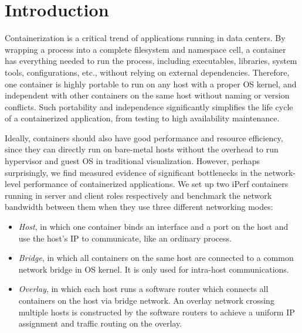 \section{Introduction} \label{sec:introduction}


Containerization is a critical trend of applications running in data centers.
By wrapping a process into a complete filesystem and namespace cell, a container
has everything needed to run the process, including executables, libraries, system
tools, configurations, etc., without relying on external dependencies. 
Therefore, one container
is highly portable to run on any host with a proper OS kernel, and independent
with other containers on the same host without naming or version conflicts.
Such portability and independence significantly simplifies the life cycle of
a containerized application, from testing to high availability maintenance.

Ideally, containers should also have good performance and resource efficiency,
since they can directly run on bare-metal hosts without the overhead to run
hypervisor and guest OS in traditional visualization. However, perhaps 
surprisingly, we find measured evidence of significant bottlenecks in the 
network-level performance of containerized applications. We set up two iPerf containers running in server and client roles respectively and benchmark the network bandwidth between them when they use three different networking modes:
\begin{itemize}
	\item {\em Host}, in which one container binds an interface
and a port on the host and use the host's IP to communicate, like an ordinary
process.
	\item {\em Bridge}, in which all containers on the same host are connected to a common network bridge in OS kernel. It is only used for
	intra-host communications.  
	\item {\em Overlay}, in which each host runs a software router which
	connects all containers on the host via bridge network. An overlay 
	network crossing multiple hosts is constructed by the software routers
	to achieve a uniform IP assignment and traffic routing on the overlay.
\end{itemize}

